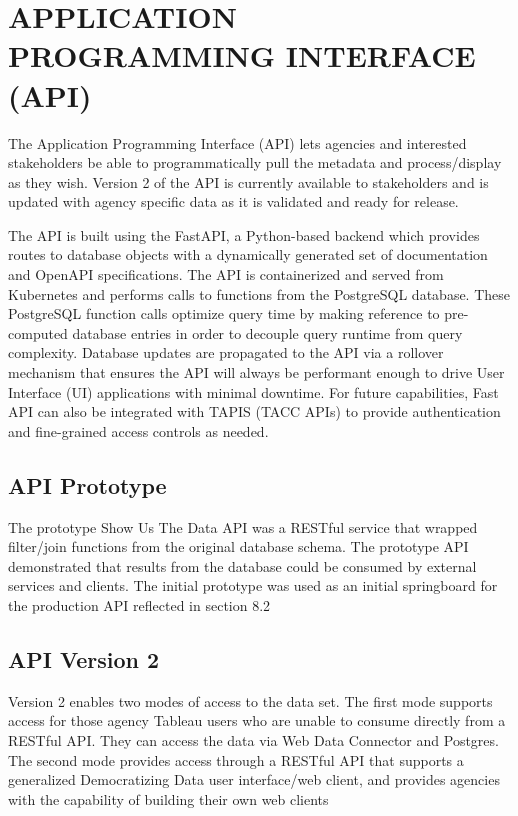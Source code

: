 \documentclass[titlepage, 11pt]{article}
\begin{document}
{\section{APPLICATION PROGRAMMING INTERFACE (API)}
\label{sec:Chapter8}
The Application Programming Interface (API) lets agencies and interested stakeholders be able to programmatically pull the metadata and process/display as they wish. Version 2 of the API is currently available to stakeholders and is updated with agency specific data as it is validated and ready for release. 

The API is built using the FastAPI, a Python-based backend which provides routes to database objects with a dynamically generated set of documentation and OpenAPI specifications. The API is containerized and served from Kubernetes and performs calls to functions from the PostgreSQL database. These PostgreSQL function calls optimize query time by making reference to pre-computed database entries in order to decouple query runtime from query complexity. Database updates are propagated to the API via a rollover mechanism that ensures the API will always be performant enough to drive User Interface (UI) applications with minimal downtime. For future capabilities, Fast API can also be integrated with TAPIS (TACC APIs) to provide authentication and fine-grained access controls as needed. 

\subsection{API Prototype}
The prototype Show Us The Data API was a RESTful service that wrapped filter/join functions from the original database schema. The prototype API demonstrated that results from the database could be consumed by external services and clients. The initial prototype was used as an initial springboard for the production API reflected in section 8.2

\subsection{API Version 2}
Version 2 enables two modes of access to the data set.   The first mode supports access for those agency Tableau users who are unable to consume directly from a RESTful API. They can access the data via Web Data Connector and Postgres. The second mode provides access through a RESTful API that supports a generalized Democratizing Data user interface/web client, and provides agencies with the capability of building their own web clients

}
\end{document}
